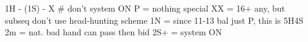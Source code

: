 1H - (1S) - X  # don't system ON
P = nothing special
XX = 16+ any, but subseq don't use head-hunting scheme
1N = since 11-13 bal just P, this is 5H4S
2m = nat. bad hand can pass then bid
2S+ = system ON